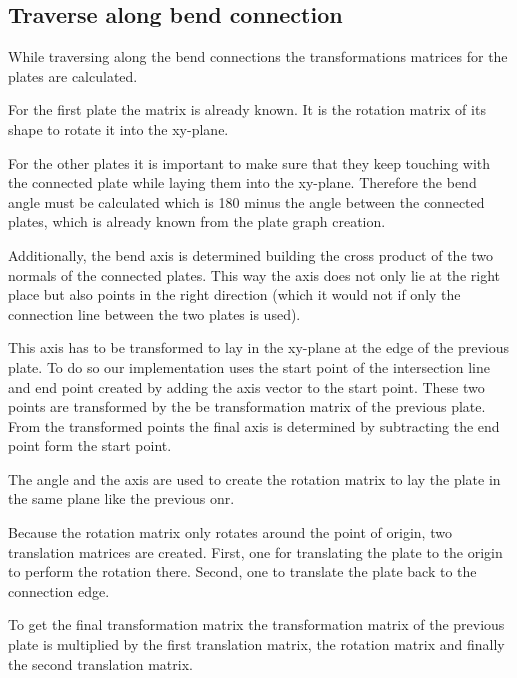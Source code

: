 \documentclass[../ClassicThesis.tex]{subfiles}
\begin{document}
\subsection{Traverse along bend connection}
\label{sec:traverse-along-bend-connection}

While traversing along the bend connections the transformations matrices for the plates are calculated.

For the first plate the matrix is already known. It is the rotation matrix of its shape to rotate it into the xy-plane.

For the other plates it is important to make sure that they keep touching with the connected plate while laying them into the xy-plane. Therefore the bend angle must be calculated which is 180\textdegree{} minus the angle between the connected plates, which is already known from the plate graph creation.

Additionally, the bend axis is determined building the cross product of the two normals of the connected plates. This way the axis does not only lie at the right place but also points in the right direction (which it would not if only the connection line between the two plates is used).

This axis has to be transformed to lay in the xy-plane at the edge of the previous plate. To do so our implementation uses the start point of the intersection line and end point created by adding the axis vector to the start point. These two points are transformed by the be transformation matrix of the previous plate. From the transformed points the final axis is determined by subtracting the end point form the start point.

The angle and the axis are used to create the rotation matrix to lay the plate in the same plane like the previous onr.

Because the rotation matrix only rotates around the point of origin, two translation matrices are created. First, one for translating the plate to the origin to perform the rotation there. Second, one to translate the plate back to the connection edge.

To get the final transformation matrix the transformation matrix of the previous plate is multiplied by the first translation matrix, the rotation matrix and finally the second translation matrix.
\end{document}
